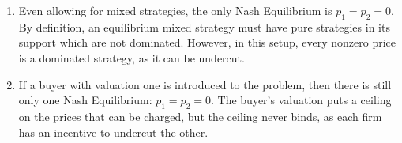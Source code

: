 \documentclass[11pt]{article}
\begin{document}
\begin{enumerate}
\begin{enumerate}
		\item Even allowing for mixed strategies, the only Nash Equilibrium is $ p_1 = p_2 = 0 $. By definition, an equilibrium mixed strategy must have pure strategies in its support which are not dominated. However, in this setup, every nonzero price is a dominated strategy, as it can be undercut. 
		
		\item If a buyer with valuation one is introduced to the problem, then there is still only one Nash Equilibrium: $ p_1 = p_2 = 0 $. The buyer's valuation puts a ceiling on the prices that can be charged, but the ceiling never binds, as each firm has an incentive to undercut the other. 
	\end{enumerate}
	
\end{enumerate}
\end{document}
